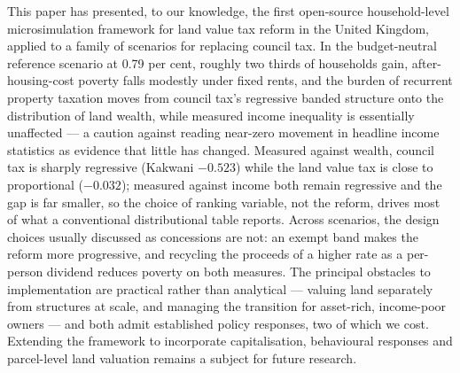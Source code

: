 This paper has presented, to our knowledge, the first open-source household-level microsimulation framework for land value tax reform in the United Kingdom, applied to a family of scenarios for replacing council tax. In the budget-neutral reference scenario at 0.79 per cent, roughly two thirds of households gain, after-housing-cost poverty falls modestly under fixed rents, and the burden of recurrent property taxation moves from council tax's regressive banded structure onto the distribution of land wealth, while measured income inequality is essentially unaffected --- a caution against reading near-zero movement in headline income statistics as evidence that little has changed. Measured against wealth, council tax is sharply regressive (Kakwani $-0.523$) while the land value tax is close to proportional ($-0.032$); measured against income both remain regressive and the gap is far smaller, so the choice of ranking variable, not the reform, drives most of what a conventional distributional table reports. Across scenarios, the design choices usually discussed as concessions are not: an exempt band makes the reform more progressive, and recycling the proceeds of a higher rate as a per-person dividend reduces poverty on both measures. The principal obstacles to implementation are practical rather than analytical --- valuing land separately from structures at scale, and managing the transition for asset-rich, income-poor owners --- and both admit established policy responses, two of which we cost. Extending the framework to incorporate capitalisation, behavioural responses and parcel-level land valuation remains a subject for future research.
